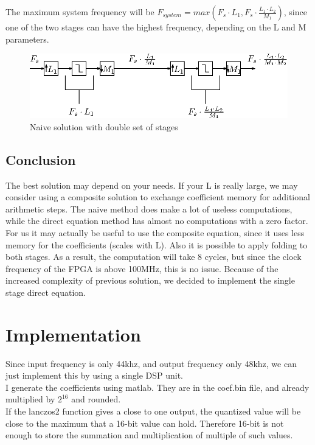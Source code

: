 \documentclass[a4paper,twoside,11pt, fleqn]{article}
\begin{document}
\smallskip
The maximum system frequency will be $F_{system} = max(F_s\cdot L_1, F_s\cdot \frac{L_1\cdot L_2}{M_1})$, since one of the two stages can have the highest frequency, depending on the L and M parameters.
\begin{figure}[h]
	\includegraphics[scale = 1]{Images/3_1}
    \caption{Naive solution with double set of stages}
\end{figure}

\subsection{Conclusion}
The best solution may depend on your needs. If your L is really large, we may consider using a composite solution to exchange coefficient memory for additional arithmetic steps. The naive method does make a lot of useless computations, while the direct equation method has almost no computations with a zero factor.\\ 

For us it may actually be useful to use the composite equation, since it uses less memory for the coefficients (scales with L). Also it is possible to apply folding to both stages. As a result, the computation will take 8 cycles, but since the clock frequency of the FPGA is above 100MHz, this is no issue. Because of the increased complexity of previous solution, we decided to implement the single stage direct equation.\\


\newpage
\section{Implementation}
Since input frequency is only 44khz, and output frequency only 48khz, we can just implement this by using a single DSP unit.\\

I generate the coefficients using matlab. They are in the coef.bin file, and already multiplied by $2^{16}$ and rounded.\\

If the lanczos2 function gives a close to one output, the quantized value will be close to the maximum that a 16-bit value can hold. Therefore 16-bit is not enough to store the summation and multiplication of multiple of such values.\\
\end{document}
